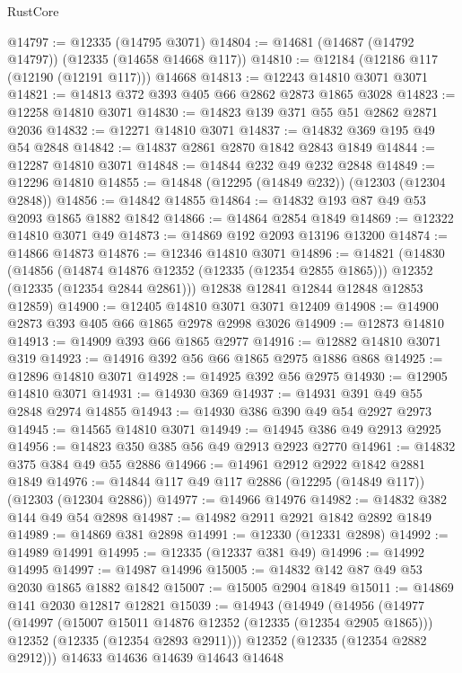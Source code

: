 \begin{lexlean}{RustCore}
\begin{coremodule}
@14797 := @12335 (@14795 @3071)
@14804 := @14681 (@14687 (@14792 @14797)) (@12335 (@14658 @14668 @117))
@14810 := @12184 (@12186 @117 (@12190 (@12191 @117))) @14668
@14813 := @12243 @14810 @3071 @3071
@14821 := @14813 @372 @393 @405 @66 @2862 @2873 @1865 @3028
@14823 := @12258 @14810 @3071
@14830 := @14823 @139 @371 @55 @51 @2862 @2871 @2036
@14832 := @12271 @14810 @3071
@14837 := @14832 @369 @195 @49 @54 @2848
@14842 := @14837 @2861 @2870 @1842 @2843 @1849
@14844 := @12287 @14810 @3071
@14848 := @14844 @232 @49 @232 @2848
@14849 := @12296 @14810
@14855 := @14848 (@12295 (@14849 @232)) (@12303 (@12304 @2848))
@14856 := @14842 @14855
@14864 := @14832 @193 @87 @49 @53 @2093 @1865 @1882 @1842
@14866 := @14864 @2854 @1849
@14869 := @12322 @14810 @3071 @49
@14873 := @14869 @192 @2093 @13196 @13200
@14874 := @14866 @14873
@14876 := @12346 @14810 @3071
@14896 := @14821
    (@14830
      (@14856
        (@14874 @14876 @12352 (@12335 (@12354 @2855 @1865)))
        @12352
        (@12335 (@12354 @2844 @2861)))
      @12838
      @12841
      @12844
      @12848
      @12853
      @12859)
@14900 := @12405 @14810 @3071 @3071 @12409
@14908 := @14900 @2873 @393 @405 @66 @1865 @2978 @2998 @3026
@14909 := @12873 @14810
@14913 := @14909 @393 @66 @1865 @2977
@14916 := @12882 @14810 @3071 @319
@14923 := @14916 @392 @56 @66 @1865 @2975 @1886 @868
@14925 := @12896 @14810 @3071
@14928 := @14925 @392 @56 @2975
@14930 := @12905 @14810 @3071
@14931 := @14930 @369
@14937 := @14931 @391 @49 @55 @2848 @2974 @14855
@14943 := @14930 @386 @390 @49 @54 @2927 @2973
@14945 := @14565 @14810 @3071
@14949 := @14945 @386 @49 @2913 @2925
@14956 := @14823 @350 @385 @56 @49 @2913 @2923 @2770
@14961 := @14832 @375 @384 @49 @55 @2886
@14966 := @14961 @2912 @2922 @1842 @2881 @1849
@14976 := @14844 @117 @49 @117 @2886 (@12295 (@14849 @117)) (@12303 (@12304 @2886))
@14977 := @14966 @14976
@14982 := @14832 @382 @144 @49 @54 @2898
@14987 := @14982 @2911 @2921 @1842 @2892 @1849
@14989 := @14869 @381 @2898
@14991 := @12330 (@12331 @2898)
@14992 := @14989 @14991
@14995 := @12335 (@12337 @381 @49)
@14996 := @14992 @14995
@14997 := @14987 @14996
@15005 := @14832 @142 @87 @49 @53 @2030 @1865 @1882 @1842
@15007 := @15005 @2904 @1849
@15011 := @14869 @141 @2030 @12817 @12821
@15039 := @14943
    (@14949
      (@14956
        (@14977
          (@14997
            (@15007 @15011 @14876 @12352 (@12335 (@12354 @2905 @1865)))
            @12352
            (@12335 (@12354 @2893 @2911)))
          @12352
          (@12335 (@12354 @2882 @2912)))
        @14633
        @14636
        @14639
        @14643
        @14648

\end{coremodule}
\end{lexlean}
